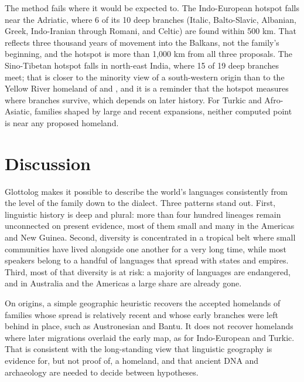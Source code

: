 \documentclass[11pt,a4paper]{article}
\begin{document}
The method fails where it would be expected to. The Indo-European hotspot falls near the Adriatic, where 6 of its 10 deep branches (Italic, Balto-Slavic, Albanian, Greek, Indo-Iranian through Romani, and Celtic) are found within 500 km. That reflects three thousand years of movement into the Balkans, not the family's beginning, and the hotspot is more than 1,000 km from all three proposals. The Sino-Tibetan hotspot falls in north-east India, where 15 of 19 deep branches meet; that is closer to the minority view of a south-western origin than to the Yellow River homeland of \citet{zhang2019} and \citet{sagart2019}, and it is a reminder that the hotspot measures where branches survive, which depends on later history. For Turkic and Afro-Asiatic, families shaped by large and recent expansions, neither computed point is near any proposed homeland.

\section{Discussion}
Glottolog makes it possible to describe the world's languages consistently from the level of the family down to the dialect. Three patterns stand out. First, linguistic history is deep and plural: more than four hundred lineages remain unconnected on present evidence, most of them small and many in the Americas and New Guinea. Second, diversity is concentrated in a tropical belt where small communities have lived alongside one another for a very long time, while most speakers belong to a handful of languages that spread with states and empires. Third, most of that diversity is at risk: a majority of languages are endangered, and in Australia and the Americas a large share are already gone.

On origins, a simple geographic heuristic recovers the accepted homelands of families whose spread is relatively recent and whose early branches were left behind in place, such as Austronesian and Bantu. It does not recover homelands where later migrations overlaid the early map, as for Indo-European and Turkic. That is consistent with the long-standing view that linguistic geography is evidence for, but not proof of, a homeland, and that ancient DNA and archaeology are needed to decide between hypotheses.
\end{document}
